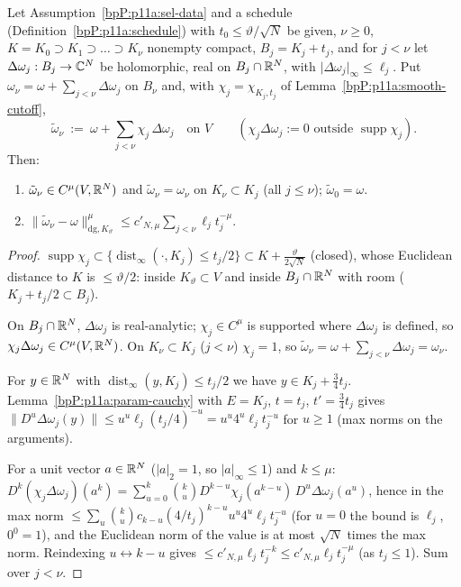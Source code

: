 \begin{lemma}\label{bpP:p11a:finite-extension}
Let Assumption~\ref{bpP:p11a:sel-data} and a schedule (Definition~\ref{bpP:p11a:schedule}) with $t_0\le\vartheta/\sqrt N$ be given, $\nu\ge0$, $K=K_0\supset K_1\supset\dots\supset K_\nu$ nonempty compact, $B_j=K_j+t_j$, and for $j<\nu$ let $\Delta\omega_j:B_j\to\mathbb{C}^N$ be holomorphic, real on $B_j\cap\mathbb{R}^N$, with $\lvert\Delta\omega_j\rvert_\infty\le\ell_j$. Put $\omega_\nu=\omega+\sum_{j<\nu}\Delta\omega_j$ on $B_\nu$ and, with $\chi_j=\chi_{K_j,t_j}$ of Lemma~\ref{bpP:p11a:smooth-cutoff},
\[\tilde\omega_\nu\ :=\ \omega+\sum_{j<\nu}\chi_j\,\Delta\omega_j\quad\text{on }V\qquad(\chi_j\Delta\omega_j:=0\text{ outside }\operatorname{supp}\chi_j).\]
Then:
\begin{enumerate}[label=(\alph*)]
\item $\tilde\omega_\nu\in C^\mu(V,\mathbb{R}^N)$ and $\tilde\omega_\nu=\omega_\nu$ on $K_\nu\subset K_j$ (all $j\le\nu$); $\tilde\omega_0=\omega$.
\item $\lVert\tilde\omega_\nu-\omega\rVert^\mu_{\mathrm{dg},K_\vartheta}\le c'_{N,\mu}\sum_{j<\nu}\ell_jt_j^{-\mu}$.
\end{enumerate}
\end{lemma}
\begin{proof}
\label{stepP:p11a:fe-supp} $\operatorname{supp}\chi_j\subset\{\operatorname{dist}_\infty(\cdot,K_j)\le t_j/2\}\subset K+\frac{\vartheta}{2\sqrt N}$ (closed), whose Euclidean distance to $K$ is $\le\vartheta/2$: inside $K_\vartheta\subset V$ and inside $B_j\cap\mathbb{R}^N$ with room ($K_j+t_j/2\subset B_j$).

\label{stepP:p11a:fe-reg} On $B_j\cap\mathbb{R}^N$, $\Delta\omega_j$ is real-analytic; $\chi_j\in C^\mu$ is supported where $\Delta\omega_j$ is defined, so $\chi_j\Delta\omega_j\in C^\mu(V,\mathbb{R}^N)$. On $K_\nu\subset K_j$ ($j<\nu$) $\chi_j=1$, so $\tilde\omega_\nu=\omega+\sum_{j<\nu}\Delta\omega_j=\omega_\nu$.

\label{stepP:p11a:fe-cauchy} For $y\in\mathbb{R}^N$ with $\operatorname{dist}_\infty(y,K_j)\le t_j/2$ we have $y\in K_j+\frac34t_j$. Lemma~\ref{bpP:p11a:param-cauchy} with $E=K_j$, $t=t_j$, $t'=\frac34t_j$ gives $\lVert D^u\Delta\omega_j(y)\rVert\le u^u\ell_j(t_j/4)^{-u}=u^u4^u\ell_jt_j^{-u}$ for $u\ge1$ (max norms on the arguments).

\label{stepP:p11a:fe-leib} For a unit vector $a\in\mathbb{R}^N$ ($\lvert a\rvert_2=1$, so $\lvert a\rvert_\infty\le1$) and $k\le\mu$: $D^k(\chi_j\Delta\omega_j)(a^k)=\sum_{u=0}^k\binom kuD^{k-u}\chi_j(a^{k-u})\,D^u\Delta\omega_j(a^u)$, hence in the max norm $\le\sum_u\binom ku c_{k-u}(4/t_j)^{k-u}u^u4^u\ell_jt_j^{-u}$ (for $u=0$ the bound is $\ell_j$, $0^0=1$), and the Euclidean norm of the value is at most $\sqrt N$ times the max norm. Reindexing $u\leftrightarrow k-u$ gives $\le c'_{N,\mu}\ell_jt_j^{-k}\le c'_{N,\mu}\ell_jt_j^{-\mu}$ (as $t_j\le1$). Sum over $j<\nu$.
\end{proof}

